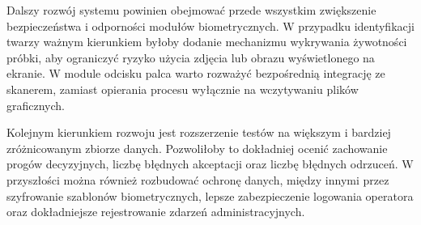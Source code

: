 Dalszy rozwój systemu powinien obejmować przede wszystkim zwiększenie bezpieczeństwa i odporności modułów biometrycznych. W przypadku identyfikacji twarzy ważnym kierunkiem byłoby dodanie mechanizmu wykrywania żywotności próbki, aby ograniczyć ryzyko użycia zdjęcia lub obrazu wyświetlonego na ekranie. W module odcisku palca warto rozważyć bezpośrednią integrację ze skanerem, zamiast opierania procesu wyłącznie na wczytywaniu plików graficznych.

Kolejnym kierunkiem rozwoju jest rozszerzenie testów na większym i bardziej zróżnicowanym zbiorze danych. Pozwoliłoby to dokładniej ocenić zachowanie progów decyzyjnych, liczbę błędnych akceptacji oraz liczbę błędnych odrzuceń. W przyszłości można również rozbudować ochronę danych, między innymi przez szyfrowanie szablonów biometrycznych, lepsze zabezpieczenie logowania operatora oraz dokładniejsze rejestrowanie zdarzeń administracyjnych.